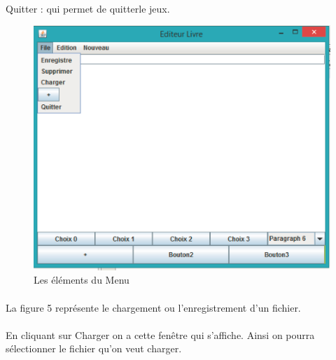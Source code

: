 \documentclass[12pt,a4paper]{article}
\begin{document}
\paragraph{}Quitter : qui permet de quitterle jeux.

\begin{figure}[ht]
  \begin{center}
    \includegraphics[width=1.1\textwidth]{./images/edit3.png} 
  \end{center}
  \caption{Les éléments du Menu}
  \label{fig:mon_image}
\end{figure}
\newpage
\paragraph{}La figure 5 représente le chargement ou l'enregistrement d'un fichier.
\paragraph{}En cliquant sur Charger on a cette fenêtre qui s'affiche. Ainsi on pourra sélectionner le fichier qu'on veut charger.
\end{document}
